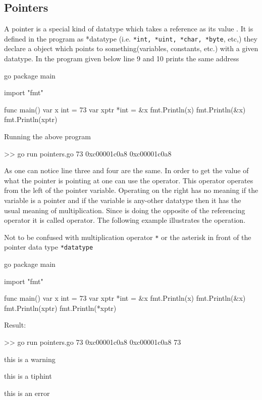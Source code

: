 \documentclass[12pt,a4paper]{report}
\begin{document}
\subsection{Pointers}
A pointer is a special kind of datatype which takes a reference as its value . It is defined in the program as *datatype (i.e. \texttt{*int, *uint, *char, *byte}, etc,) they declare a  object which points to something(variables, constants, etc.) with a given datatype.
In the program given below line 9 and 10 prints the same address
%
\begin{code}{go}
package main

import "fmt"

func main() {
  var x int = 73
  var xptr *int = &x
  fmt.Println(x)
  fmt.Println(&x)
  fmt.Println(xptr)
}
\end{code}
%
Running the above program
\begin{literal}
>> go run pointers.go
73
0xc00001c0a8
0xc00001c0a8
\end{literal}
%
As one can notice line three and four are the same. In order to get the value of what the pointer is pointing at one can use the \pre{*} operator. This operator operates from the left of the pointer variable. Operating on the right has no meaning if the variable is a pointer and if the variable is any-other datatype then it has the usual meaning of multiplication. Since \pre{*} is doing the opposite of the referencing operator \pre{\&} it is called  operator. The following example illustrates the operation.
%
\begin{note}
	Not to be confused with multiplication operator \texttt{*} or the asterisk in front of the pointer data type \texttt{*datatype}
\end{note}
%
\begin{code}{go}
package main

import "fmt"

func main() {
  var x int = 73
  var xptr *int = &x
  fmt.Println(x)
  fmt.Println(&x)
  fmt.Println(xptr)
  fmt.Println(*xptr)
}
\end{code}
%
Result:
%
\begin{literal}
>> go run pointers.go
73
0xc00001c0a8
0xc00001c0a8
73
\end{literal}

\begin{warning}this is a warning\end{warning}
\begin{tip}{this is a tiphint}\end{tip}
\begin{error}this is an error\end{error}
\end{document}
